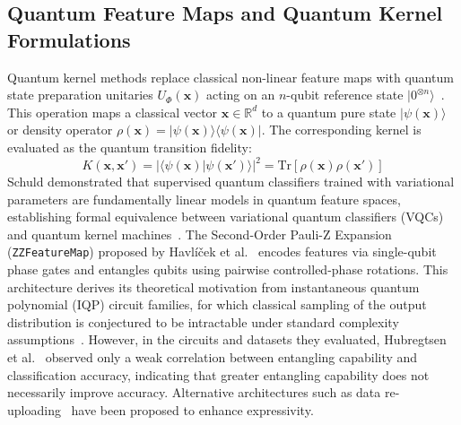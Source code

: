 \documentclass[12pt,a4paper]{article}
\begin{document}
\subsection{Quantum Feature Maps and Quantum Kernel Formulations}
Quantum kernel methods replace classical non-linear feature maps with quantum state preparation unitaries $U_\Phi(\mathbf{x})$ acting on an $n$-qubit reference state $|0^{\otimes n}\rangle$~\cite{havlicek2019supervised, schuld2019quantum}. This operation maps a classical vector $\mathbf{x} \in \mathbb{R}^d$ to a quantum pure state $|\psi(\mathbf{x})\rangle$ or density operator $\rho(\mathbf{x}) = |\psi(\mathbf{x})\rangle\langle\psi(\mathbf{x})|$. The corresponding kernel is evaluated as the quantum transition fidelity:
\begin{equation}
K(\mathbf{x}, \mathbf{x}') = |\langle \psi(\mathbf{x}) | \psi(\mathbf{x}') \rangle|^2 = \text{Tr}\left[\rho(\mathbf{x})\rho(\mathbf{x}')\right]
\end{equation}
Schuld demonstrated that supervised quantum classifiers trained with variational parameters are fundamentally linear models in quantum feature spaces, establishing formal equivalence between variational quantum classifiers (VQCs) and quantum kernel machines~\cite{schuld2021supervised}. The Second-Order Pauli-Z Expansion (\texttt{ZZFeatureMap}) proposed by Havl{\'i}{\v{c}}ek et al.~\cite{havlicek2019supervised} encodes features via single-qubit phase gates and entangles qubits using pairwise controlled-phase rotations. This architecture derives its theoretical motivation from instantaneous quantum polynomial (IQP) circuit families, for which classical sampling of the output distribution is conjectured to be intractable under standard complexity assumptions~\cite{bremner2016average, suzuki2020analysis}. However, in the circuits and datasets they evaluated, Hubregtsen et al.~\cite{hubregtsen2021evaluation} observed only a weak correlation between entangling capability and classification accuracy, indicating that greater entangling capability does not necessarily improve accuracy. Alternative architectures such as data re-uploading~\cite{perezsalinas2020data} have been proposed to enhance expressivity.
\end{document}
